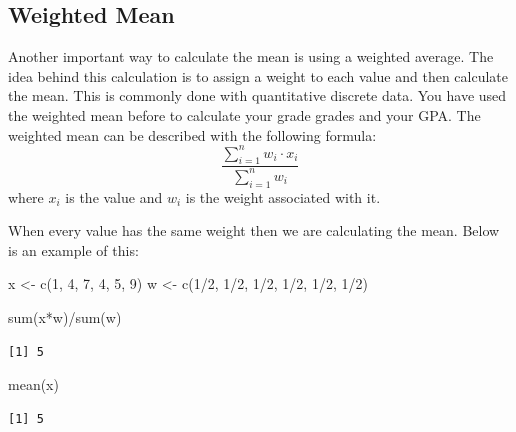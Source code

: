 \documentclass[
  letterpaper,
  DIV=11,
  numbers=noendperiod]{scrreprt}
\newenvironment{Shaded}{\begin{snugshade}}{\end{snugshade}}
\newcommand{\DecValTok}[1]{\textcolor[rgb]{0.68,0.00,0.00}{#1}}
\newcommand{\FunctionTok}[1]{\textcolor[rgb]{0.28,0.35,0.67}{#1}}
\newcommand{\NormalTok}[1]{\textcolor[rgb]{0.00,0.23,0.31}{#1}}
\newcommand{\OtherTok}[1]{\textcolor[rgb]{0.00,0.23,0.31}{#1}}
\newcommand{\SpecialCharTok}[1]{\textcolor[rgb]{0.37,0.37,0.37}{#1}}
\begin{document}
\subsection{Weighted Mean}\label{weighted-mean}

Another important way to calculate the mean is using a weighted average.
The idea behind this calculation is to assign a weight to each value and
then calculate the mean. This is commonly done with quantitative
discrete data. You have used the weighted mean before to calculate your
grade grades and your GPA. The weighted mean can be described with the
following formula:
\[ \frac{\sum_{i=1}^n w_i\cdot x_i}{\sum_{i=1}^n w_i} \] where \(x_i\)
is the value and \(w_i\) is the weight associated with it.

When every value has the same weight then we are calculating the mean.
Below is an example of this:

\begin{Shaded}
\begin{Highlighting}[]
\NormalTok{x }\OtherTok{\textless{}{-}} \FunctionTok{c}\NormalTok{(}\DecValTok{1}\NormalTok{, }\DecValTok{4}\NormalTok{, }\DecValTok{7}\NormalTok{, }\DecValTok{4}\NormalTok{, }\DecValTok{5}\NormalTok{, }\DecValTok{9}\NormalTok{)}
\NormalTok{w }\OtherTok{\textless{}{-}} \FunctionTok{c}\NormalTok{(}\DecValTok{1}\SpecialCharTok{/}\DecValTok{2}\NormalTok{, }\DecValTok{1}\SpecialCharTok{/}\DecValTok{2}\NormalTok{, }\DecValTok{1}\SpecialCharTok{/}\DecValTok{2}\NormalTok{, }\DecValTok{1}\SpecialCharTok{/}\DecValTok{2}\NormalTok{, }\DecValTok{1}\SpecialCharTok{/}\DecValTok{2}\NormalTok{, }\DecValTok{1}\SpecialCharTok{/}\DecValTok{2}\NormalTok{)}

\FunctionTok{sum}\NormalTok{(x}\SpecialCharTok{*}\NormalTok{w)}\SpecialCharTok{/}\FunctionTok{sum}\NormalTok{(w)}
\end{Highlighting}
\end{Shaded}

\begin{verbatim}
[1] 5
\end{verbatim}

\begin{Shaded}
\begin{Highlighting}[]
\FunctionTok{mean}\NormalTok{(x)}
\end{Highlighting}
\end{Shaded}

\begin{verbatim}
[1] 5
\end{verbatim}
\end{document}
